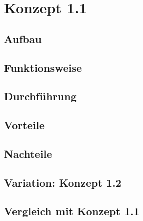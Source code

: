 \section{Konzept 1.1}

\subsection{Aufbau}

\subsection{Funktionsweise}

\subsection{Durchf\"{u}hrung}

\subsection{Vorteile}

\subsection{Nachteile}

\subsection{Variation: Konzept 1.2}

\subsection{Vergleich mit Konzept 1.1}
